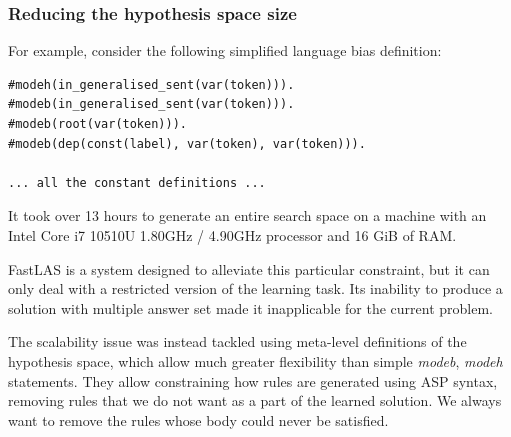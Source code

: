 \subsubsection{Reducing the hypothesis space size}
\label{reducing-the-hypothesis-space-size}

For example, consider the following simplified language bias definition:
\begin{verbatim}
#modeh(in_generalised_sent(var(token))).
#modeb(in_generalised_sent(var(token))).
#modeb(root(var(token))).
#modeb(dep(const(label), var(token), var(token))).

... all the constant definitions ...
\end{verbatim}


It took over 13 hours to generate an entire search space on a machine with an Intel Core i7 10510U 1.80GHz / 4.90GHz processor and 16 GiB of RAM.

FastLAS \cite{RefWorks:RefID:19-law2020fastlas:} is a system designed to alleviate this particular constraint, but it can only deal with a restricted version of the learning task.
Its inability to produce a solution with multiple answer set made it inapplicable for the current problem.

The scalability issue was instead tackled using meta-level definitions of the hypothesis space, which allow much greater flexibility than simple \textit{modeb}, \textit{modeh} statements. 
They allow constraining how rules are generated using ASP syntax, removing rules that we do not want as a part of the learned solution.
We always want to remove the rules whose body could never be satisfied.

